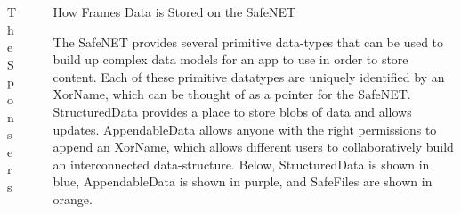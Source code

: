 \documentclass[final]{beamer}
\newlength{\sepwid}
\newlength{\onecolwid}
\newlength{\twocolwid}
\begin{document}
\begin{frame}[t]
\begin{columns}[t]
\begin{column}{\onecolwid}
\begin{block}{The Sponsers}
  \begin{figure}
  \end{figure}


\end{block}





\end{column} %

\begin{column}{\sepwid}\end{column} %

\begin{column}{\twocolwid} %

\begin{columns}[t,totalwidth=\twocolwid] %

\begin{column}{\onecolwid}\vspace{-.6in} %


\begin{block}{How Frames Data is Stored on the SafeNET}

  The SafeNET provides several primitive data-types that can be used
  to build up complex data models for an app to use in order to store
  content. Each of these primitive datatypes are uniquely identified by
  an XorName, which can be thought of as a pointer for the SafeNET.
  StructuredData provides a place to store blobs of data and
  allows updates. AppendableData allows anyone with the right permissions
  to append an XorName, which allows different users to collaboratively
  build an interconnected data-structure. Below, StructuredData is shown
  in blue, AppendableData is shown in purple, and SafeFiles are shown in
  orange.


\end{block}
\end{column}
\end{columns}
\end{column}
\end{columns}
\end{frame}
\end{document}
